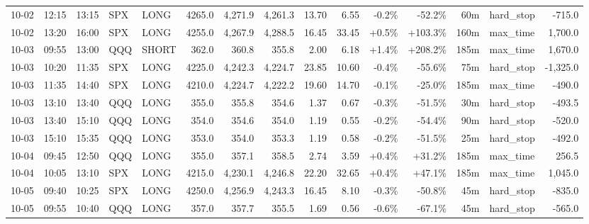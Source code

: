 \documentclass[11pt,a4paper,twoside]{article}
\begin{document}
\begin{landscape}
\begin{center}
\begin{longtable}{>{\color{txtmain}}l l l l l r r r r r r r r >{\color{txtmain}}l r}
10-02 & 12:15 & 13:15 & SPX & LONG & 4265.0 & 4,271.9 & 4,261.3 & 13.70 & 6.55 & \textcolor{lossred}{-0.2\%} & \textcolor{lossred}{-52.2\%} & 60m & hard\_stop & \textcolor{lossred}{-715.0} \\
10-02 & 13:20 & 16:00 & SPX & LONG & 4255.0 & 4,267.9 & 4,288.5 & 16.45 & 33.45 & \textcolor{wingreen}{+0.5\%} & \textcolor{wingreen}{+103.3\%} & 160m & max\_time & \textcolor{wingreen}{1,700.0} \\
10-03 & 09:55 & 13:00 & QQQ & SHORT & 362.0 & 360.8 & 355.8 & 2.00 & 6.18 & \textcolor{wingreen}{+1.4\%} & \textcolor{wingreen}{+208.2\%} & 185m & max\_time & \textcolor{wingreen}{1,670.0} \\
10-03 & 10:20 & 11:35 & SPX & LONG & 4225.0 & 4,242.3 & 4,224.7 & 23.85 & 10.60 & \textcolor{lossred}{-0.4\%} & \textcolor{lossred}{-55.6\%} & 75m & hard\_stop & \textcolor{lossred}{-1,325.0} \\
10-03 & 11:35 & 14:40 & SPX & LONG & 4210.0 & 4,224.7 & 4,222.2 & 19.60 & 14.70 & \textcolor{lossred}{-0.1\%} & \textcolor{lossred}{-25.0\%} & 185m & max\_time & \textcolor{lossred}{-490.0} \\
10-03 & 13:10 & 13:40 & QQQ & LONG & 355.0 & 355.8 & 354.6 & 1.37 & 0.67 & \textcolor{lossred}{-0.3\%} & \textcolor{lossred}{-51.5\%} & 30m & hard\_stop & \textcolor{lossred}{-493.5} \\
10-03 & 13:40 & 15:10 & QQQ & LONG & 354.0 & 354.6 & 354.0 & 1.19 & 0.55 & \textcolor{lossred}{-0.2\%} & \textcolor{lossred}{-54.4\%} & 90m & hard\_stop & \textcolor{lossred}{-520.0} \\
10-03 & 15:10 & 15:35 & QQQ & LONG & 353.0 & 354.0 & 353.3 & 1.19 & 0.58 & \textcolor{lossred}{-0.2\%} & \textcolor{lossred}{-51.5\%} & 25m & hard\_stop & \textcolor{lossred}{-492.0} \\
10-04 & 09:45 & 12:50 & QQQ & LONG & 355.0 & 357.1 & 358.5 & 2.74 & 3.59 & \textcolor{wingreen}{+0.4\%} & \textcolor{wingreen}{+31.2\%} & 185m & max\_time & \textcolor{wingreen}{256.5} \\
10-04 & 10:05 & 13:10 & SPX & LONG & 4215.0 & 4,230.1 & 4,246.8 & 22.20 & 32.65 & \textcolor{wingreen}{+0.4\%} & \textcolor{wingreen}{+47.1\%} & 185m & max\_time & \textcolor{wingreen}{1,045.0} \\
10-05 & 09:40 & 10:25 & SPX & LONG & 4250.0 & 4,256.9 & 4,243.3 & 16.45 & 8.10 & \textcolor{lossred}{-0.3\%} & \textcolor{lossred}{-50.8\%} & 45m & hard\_stop & \textcolor{lossred}{-835.0} \\
10-05 & 09:55 & 10:40 & QQQ & LONG & 357.0 & 357.7 & 355.5 & 1.69 & 0.56 & \textcolor{lossred}{-0.6\%} & \textcolor{lossred}{-67.1\%} & 45m & hard\_stop & \textcolor{lossred}{-565.0} \\

\end{longtable}
\end{center}
\end{landscape}
\end{document}
